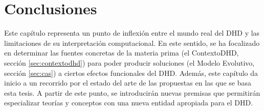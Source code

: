 \section{Conclusiones}


Este capítulo representa un punto de inflexión entre el mundo real del DHD y las limitaciones de su interpretación computacional. En este sentido, se ha focalizado en determinar las fuentes concretas de la materia prima (el ContextoDHD, sección \ref{sec:contextodhd}) para poder producir soluciones (el Modelo Evolutivo, sección \ref{sec:cas}) a ciertos efectos funcionales del DHD. Además, este capítulo da inicio a un recorrido por el estado del arte de las propuestas en las que se basa esta tesis. A partir de este punto, se introducirán nuevas premisas que permitirán especializar teorías y conceptos con una nueva entidad apropiada para el DHD.

